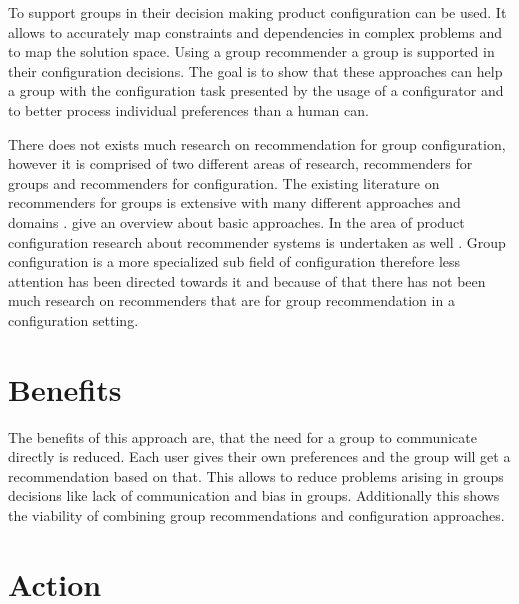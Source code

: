 To support groups in their decision making product configuration can be used. It allows to accurately map constraints and dependencies in complex problems and to map the solution space. Using a group recommender a group is supported in their configuration decisions. The goal is to show that these approaches can help a group with the configuration task presented by the usage of a configurator and to better process individual preferences than a human can.


There does not exists much research on recommendation for group configuration, however it is comprised of two different areas of research, recommenders for groups and recommenders for configuration.
The existing literature on recommenders for groups is extensive with many different approaches and domains \cite{delicResearchMethodsGroup2016, chenInterfaceInteractionDesign2011, atasItemRecommendationUsing2017, jamesonRecommendationGroups2007, chenEmpatheticonsDesigningEmotion2014, liuCGSPAComprehensiveGroup2019}. \citeauthor{felfernigGroupRecommenderSystems2018} \cite{felfernigGroupRecommenderSystems2018} give an overview about basic approaches.
In the area of product configuration research about recommender systems is undertaken as well \cite{pereiraFeatureBasedPersonalizedRecommender2016, scholzConfigurationbasedRecommenderSystem2017, scholzEffectsDecisionSpace2017}.
Group configuration is a more specialized sub field of configuration therefore less attention has been directed towards it and because of that there has not been much research on recommenders that are for group recommendation in a configuration setting.

\section{Benefits}
\label{sec:Introduction:Benefits}

The benefits of this approach are, that the need for a group to communicate directly is reduced. Each user gives their own preferences and the group will get a recommendation based on that. This allows to reduce problems arising in groups decisions like lack of communication and bias in groups. Additionally this shows the viability of combining group recommendations and configuration approaches.

\section{Action}
\label{sec:Introduction:Action}

